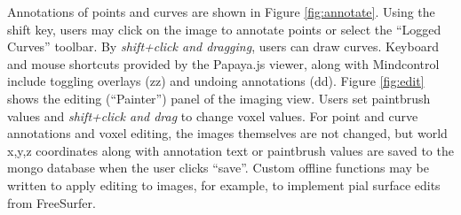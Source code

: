 Annotations of points and curves are shown in Figure \ref{fig:annotate}. Using the shift key, users may click on the image to annotate points or select the ``Logged Curves'' toolbar. By \textit{shift+click and dragging}, users can draw curves. Keyboard and mouse shortcuts provided by the Papaya.js viewer, along with Mindcontrol include toggling overlays (zz) and undoing annotations (dd). Figure \ref{fig:edit} shows the editing (``Painter'') panel of the imaging view. Users set paintbrush values and \textit{shift+click and drag} to change voxel values. For point and curve annotations and voxel editing, the images themselves are not changed, but world x,y,z coordinates along with annotation text or paintbrush values are saved to the mongo database when the user clicks ``save''. Custom offline functions may be written to apply editing to images, for example, to implement pial surface edits from FreeSurfer. 